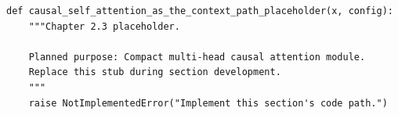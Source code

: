 \begin{lstlisting}[style=bookpython,caption={Planned code placeholder for causal self attention as the context path.},label={lst:ch02-causal-self-attention-as-the-context-path}]
def causal_self_attention_as_the_context_path_placeholder(x, config):
    """Chapter 2.3 placeholder.

    Planned purpose: Compact multi-head causal attention module.
    Replace this stub during section development.
    """
    raise NotImplementedError("Implement this section's code path.")
\end{lstlisting}
